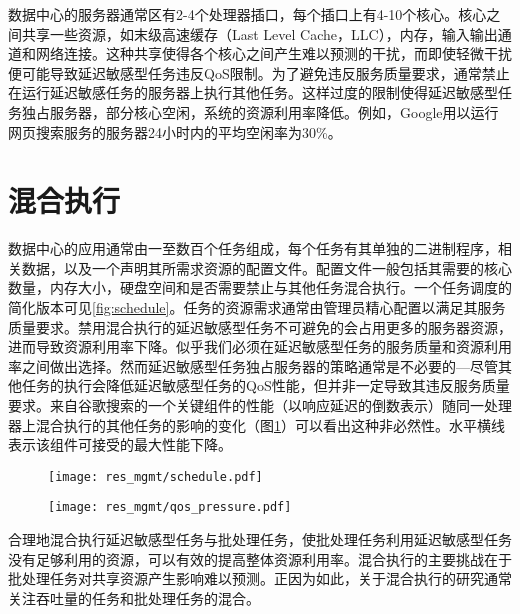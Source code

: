 数据中心的服务器通常区有2-4个处理器插口，每个插口上有4-10个核心。核心之间共享一些资源，如末级高速缓存（Last Level Cache，LLC），内存，输入输出通道和网络连接。这种共享使得各个核心之间产生难以预测的干扰，而即使轻微干扰便可能导致延迟敏感型任务违反QoS限制\cite{janapa2010web}\cite{nesbit2006fair}\cite{meisner2011power}。为了避免违反服务质量要求，通常禁止在运行延迟敏感任务的服务器上执行其他任务。这样过度的限制使得延迟敏感型任务独占服务器，部分核心空闲，系统的资源利用率降低。例如，Google用以运行网页搜索服务的服务器24小时内的平均空闲率为30\%\cite{lo2014towards}。

\section{混合执行}
数据中心的应用通常由一至数百个任务组成，每个任务有其单独的二进制程序，相关数据，以及一个声明其所需求资源的配置文件\cite{mishra2010towards}。配置文件一般包括其需要的核心数量，内存大小，硬盘空间和是否需要禁止与其他任务混合执行。一个任务调度的简化版本可见\ref{fig:schedule}。任务的资源需求通常由管理员精心配置以满足其服务质量要求。禁用混合执行的延迟敏感型任务不可避免的会占用更多的服务器资源，进而导致资源利用率下降。似乎我们必须在延迟敏感型任务的服务质量和资源利用率之间做出选择。然而延迟敏感型任务独占服务器的策略通常是不必要的---尽管其他任务的执行会降低延迟敏感型任务的QoS性能，但并非一定导致其违反服务质量要求。来自谷歌搜索的一个关键组件的性能（以响应延迟的倒数表示）随同一处理器上混合执行的其他任务的影响的变化（图\ref{fig:qos_pressure}）可以看出这种非必然性\cite{mars2011bubble}。水平横线表示该组件可接受的最大性能下降。
\begin{figure}
\centering
\begin{minipage}{.5\textwidth}
  \centering
  \texttt{[image: res\_mgmt/schedule.pdf]}
  \label{fig:schedule}
\end{minipage}%
\begin{minipage}{.5\textwidth}
  \centering
  \texttt{[image: res\_mgmt/qos\_pressure.pdf]}
  \label{fig:qos_pressure}
\end{minipage}
\end{figure}

合理地混合执行延迟敏感型任务与批处理任务，使批处理任务利用延迟敏感型任务没有足够利用的资源，可以有效的提高整体资源利用率\cite{delimitrou2013paragon}\cite{mars2011bubble}\cite{marshall2011improving}。混合执行的主要挑战在于批处理任务对共享资源产生影响难以预测。正因为如此，关于混合执行的研究通常关注吞吐量的任务和批处理任务的混合\cite{cook2013hardware}\cite{nathuji2010q}。


